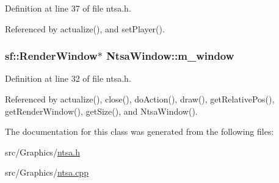 Definition at line 37 of file ntsa.\-h.



Referenced by actualize(), and set\-Player().

\hypertarget{class_ntsa_window_a6dec64dcc128fe25647d172cc28d7294}{
\subsubsection[{m\-\_\-window}]{\setlength{\rightskip}{0pt plus 5cm}sf\-::\-Render\-Window$\ast$ Ntsa\-Window\-::m\-\_\-window\hspace{0.3cm}{\ttfamily [private]}}}\label{class_ntsa_window_a6dec64dcc128fe25647d172cc28d7294}


Definition at line 32 of file ntsa.\-h.



Referenced by actualize(), close(), do\-Action(), draw(), get\-Relative\-Pos(), get\-Render\-Window(), get\-Size(), and Ntsa\-Window().



The documentation for this class was generated from the following files\-:\begin{DoxyCompactItemize}
\item 
src/\-Graphics/\hyperlink{ntsa_8h}{ntsa.\-h}\item 
src/\-Graphics/\hyperlink{ntsa_8cpp}{ntsa.\-cpp}\end{DoxyCompactItemize}
